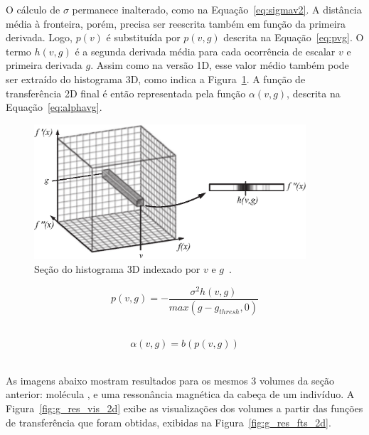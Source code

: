 	O cálculo de $\sigma$ permanece inalterado, como na Equação~\eqref{eq:sigmav2}. A distância média à fronteira, porém, precisa ser reescrita também em função da primeira derivada. Logo, $p(v)$ é substituída por $p(v,g)$ descrita na Equação~\eqref{eq:pvg}. O termo $h(v,g)$ é a segunda derivada média para cada ocorrência de escalar $v$ e primeira derivada $g$. Assim como na versão 1D, esse valor médio também pode ser extraído do histograma 3D, como indica a Figura~\ref{fig:g_hvg}. A função de transferência 2D final é então representada pela função $ \alpha(v, g) $, descrita na Equação~\eqref{eq:alphavg}.
    
\begin{figure}[h]
	\centering
	\includegraphics[width=0.9\textwidth]{images/g_hvg}
	\caption{Seção do histograma 3D indexado por $ v $ e $ g $~\cite{gordonms}.}
	\label{fig:g_hvg}
\end{figure}
    
\begin{equation} \label{eq:pvg}
	p(v,g) = -\frac{\sigma^{2}h(v,g)}{max(g - g_{thresh}, 0)}
\end{equation} \

\begin{equation} \label{eq:alphavg}
	\alpha(v, g) = b(p(v, g))
\end{equation} \

	As imagens abaixo mostram resultados para os mesmos 3 volumes da seção anterior: molécula ,  e uma ressonância magnética da cabeça de um indivíduo. A Figura~\ref{fig:g_res_vis_2d} exibe as visualizações dos volumes a partir das funções de transferência que foram obtidas, exibidas na Figura~\ref{fig:g_res_fts_2d}.
	
